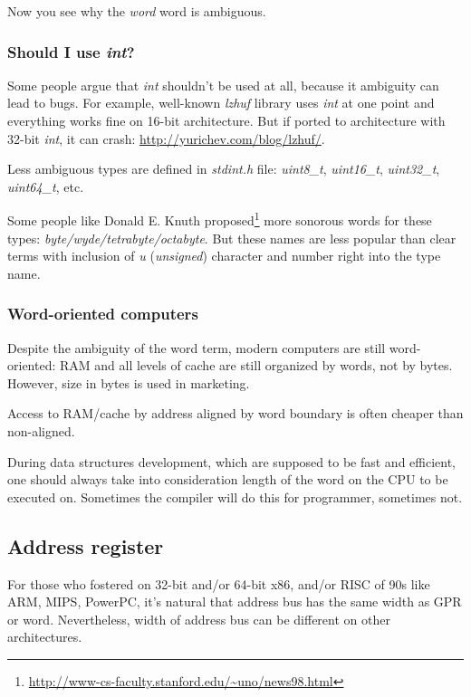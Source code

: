 Now you see why the \emph{word} word is ambiguous.

\subsubsection{Should I use \emph{int}?}

Some people argue that \emph{int} shouldn't be used at all, because it ambiguity can lead to bugs.
For example, well-known \emph{lzhuf} library uses \emph{int} at one point and everything works fine on 16-bit architecture.
But if ported to architecture with 32-bit \emph{int}, it can crash: \url{http://yurichev.com/blog/lzhuf/}.

Less ambiguous types are defined in \emph{stdint.h} file:
\emph{uint8\_t}, \emph{uint16\_t}, \emph{uint32\_t}, \emph{uint64\_t}, etc.

Some people like Donald E. Knuth proposed\footnote{\url{http://www-cs-faculty.stanford.edu/~uno/news98.html}}
more sonorous words
for these types: \emph{byte/wyde/tetrabyte/octabyte}.
But these names are less popular than clear terms with inclusion of \emph{u} (\emph{unsigned}) character 
and number right into the type name.

\subsubsection{Word-oriented computers}

Despite the ambiguity of the \gls{word} term, modern computers are still word-oriented: \ac{RAM} and all levels of cache
are still organized by words, not by bytes.
However, size in bytes is used in marketing.

Access to RAM/cache by address aligned by word boundary is often cheaper than non-aligned.

During data structures development, which are supposed to be fast and efficient,
one should always take into consideration length of the \gls{word} on the CPU to be executed on.
Sometimes the compiler will do this for programmer, sometimes not.

\subsection{Address register}

For those who fostered on 32-bit and/or 64-bit x86, and/or RISC of 90s like ARM, MIPS, PowerPC, it's natural that
address bus has the same width as \ac{GPR} or \gls{word}.
Nevertheless, width of address bus can be different on other architectures.

